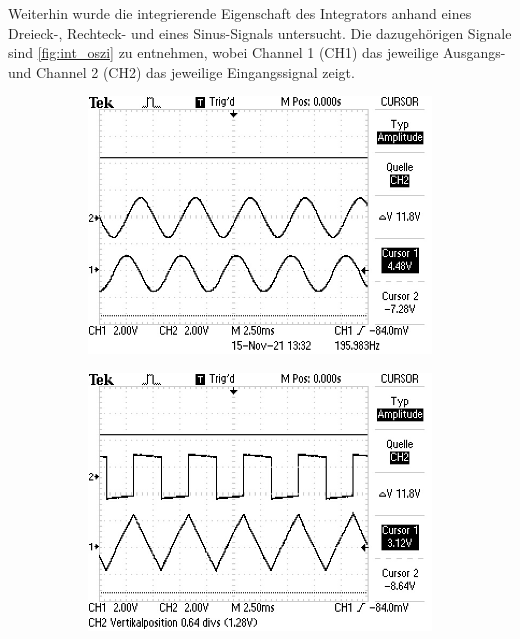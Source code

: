 Weiterhin wurde die integrierende Eigenschaft des Integrators anhand eines Dreieck-, Rechteck- und eines Sinus-Signals untersucht. Die dazugehörigen Signale sind \autoref{fig:int_oszi} zu entnehmen, wobei Channel 1 (CH1) das jeweilige Ausgangs- und Channel 2 (CH2) das jeweilige Eingangssignal zeigt.

\begin{figure}[H]
  \centering
  \begin{subfigure}{.4\textwidth}
    \includegraphics[width=\linewidth]{data/ALL0059/F0059TEK.JPG}
  \end{subfigure}
  \begin{subfigure}{.4\textwidth}
    \includegraphics[width=\linewidth]{data/ALL0060/F0060TEK.JPG}

\end{subfigure}
\end{figure}
